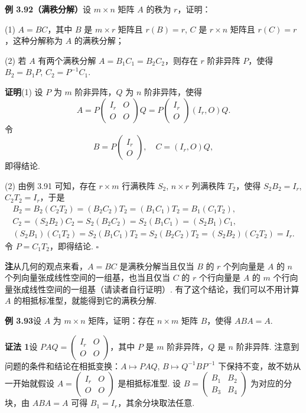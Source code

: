 \documentclass[UTF8, 12pt, fontset=fandol, oneside]{ctexart}
\begin{document}
\noindent\textbf{例 3.92（满秩分解）}\quad 设 $m\times n$ 矩阵 $A$ 的秩为 $r$，证明：

(1) $A=BC$，其中 $B$ 是 $m\times r$ 矩阵且 $r(B)=r$, $C$ 是 $r\times n$ 矩阵且 $r(C)=r$，这种分解称为 $A$ 的满秩分解；

(2) 若 $A$ 有两个满秩分解 $A=B_1C_1=B_2C_2$，则存在 $r$ 阶非异阵 $P$，使得 $B_2=B_1P$, $C_2=P^{-1}C_1$.

\noindent\textbf{证明}\quad (1) 设 $P$ 为 $m$ 阶非异阵，$Q$ 为 $n$ 阶非异阵，使得
\[
A=P\begin{pmatrix}I_r&O\\O&O\end{pmatrix}Q
=P\begin{pmatrix}I_r\\O\end{pmatrix}(I_r,O)Q.
\]
令
\[
B=P\begin{pmatrix}I_r\\O\end{pmatrix},\quad C=(I_r,O)Q,
\]
即得结论.

(2) 由例 3.91 可知，存在 $r\times m$ 行满秩阵 $S_2$, $n\times r$ 列满秩阵 $T_2$，使得 $S_2B_2=I_r$, $C_2T_2=I_r$，于是
\[
\begin{gathered}
B_2=B_2(C_2T_2)=(B_2C_2)T_2=(B_1C_1)T_2=B_1(C_1T_2),\\
C_2=(S_2B_2)C_2=S_2(B_2C_2)=S_2(B_1C_1)=(S_2B_1)C_1,\\
(S_2B_1)(C_1T_2)=S_2(B_1C_1)T_2=S_2(B_2C_2)T_2=(S_2B_2)(C_2T_2)=I_r.
\end{gathered}
\]
令 $P=C_1T_2$，即得结论. $\square$

\noindent\textbf{注}\quad 从几何的观点来看，$A=BC$ 是满秩分解当且仅当 $B$ 的 $r$ 个列向量是 $A$ 的 $n$ 个列向量张成线性空间的一组基，也当且仅当 $C$ 的 $r$ 个行向量是 $A$ 的 $m$ 个行向量张成线性空间的一组基（请读者自行证明）. 有了这个结论，我们可以不用计算 $A$ 的相抵标准型，就能得到它的满秩分解.

\noindent\textbf{例 3.93}\quad 设 $A$ 为 $m\times n$ 矩阵，证明：存在 $n\times m$ 矩阵 $B$，使得 $ABA=A$.

\noindent\textbf{证法 1}\quad 设 $PAQ=\begin{pmatrix}I_r&O\\O&O\end{pmatrix}$，其中 $P$ 是 $m$ 阶非异阵，$Q$ 是 $n$ 阶非异阵. 注意到问题的条件和结论在相抵变换：$A\mapsto PAQ$, $B\mapsto Q^{-1}BP^{-1}$ 下保持不变，故不妨从一开始就假设 $A=\begin{pmatrix}I_r&O\\O&O\end{pmatrix}$ 是相抵标准型. 设 $B=\begin{pmatrix}B_1&B_2\\B_3&B_4\end{pmatrix}$ 为对应的分块，由 $ABA=A$ 可得 $B_1=I_r$，其余分块取法任意.
\end{document}
